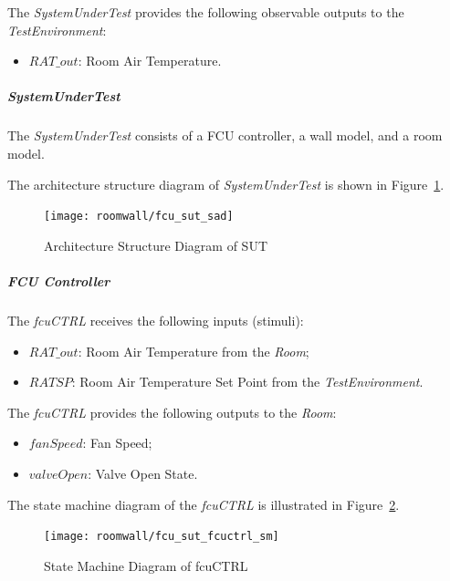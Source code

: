 The \emph{SystemUnderTest} provides the following observable outputs to the \emph{TestEnvironment}:
\begin{itemize}
    \item $RAT\_out$: Room Air Temperature.
\end{itemize}

\subparagraph{SystemUnderTest}
The \emph{SystemUnderTest} consists of a FCU controller, a wall model, and a room model.

The architecture structure diagram of \emph{SystemUnderTest} is shown in Figure~\ref{fig:fcu_sut_sad}. 
\begin{figure}[htb!]
    \centering
	\texttt{[image: roomwall/fcu\_sut\_sad]}
    \caption{Architecture Structure Diagram of SUT}
    \label{fig:fcu_sut_sad}
\end{figure}

\subparagraph{FCU Controller}
The \emph{fcuCTRL} receives the following inputs (stimuli):
\begin{itemize}
    \item $RAT\_out$: Room Air Temperature from the \emph{Room};
    \item $RATSP$: Room Air Temperature Set Point from the \emph{TestEnvironment}.
\end{itemize}

The \emph{fcuCTRL} provides the following outputs to the \emph{Room}:
\begin{itemize}
    \item $fanSpeed$: Fan Speed; 
    \item $valveOpen$: Valve Open State.
\end{itemize}

The state machine diagram of the \emph{fcuCTRL} is illustrated in Figure~\ref{fig:fcu_sut_fcuctrl_sm}.
\begin{figure}[htb!]
    \centering
	\texttt{[image: roomwall/fcu\_sut\_fcuctrl\_sm]}
    \caption{State Machine Diagram of fcuCTRL}
    \label{fig:fcu_sut_fcuctrl_sm}
\end{figure}

